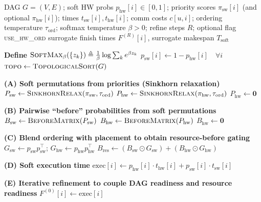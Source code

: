 \begin{algorithm}[!htbp]
\caption{DiffSchedule--Order (Differentiable surrogate for Diff-GNN with ordering)}
\label{alg:diff_order_clean}
\scriptsize
\begin{algorithmic}[1]
\Require DAG $G=(V,E)$; soft HW probs $p_{\mathrm{hw}}[i]\in[0,1]$; priority scores $\pi_{\mathrm{sw}}[i]$ (and optional $\pi_{\mathrm{hw}}[i]$);
times $t_{\mathrm{sw}}[i],t_{\mathrm{hw}}[i]$; comm costs $c[u,i]$; ordering temperature $\tau_{\mathrm{ord}}$; softmax temperature $\beta>0$; refine steps $R$; optional flag \textsc{use\_hw\_ord}
\Ensure surrogate finish times $F^{(R)}[i]$, surrogate makespan $T_{\mathrm{soft}}$

\State \textbf{Define} $\textsc{SoftMax}_\beta(\{z_k\}) \triangleq \frac{1}{\beta}\log\sum_k e^{\beta z_k}$
\State $p_{\mathrm{sw}}[i]\gets 1-p_{\mathrm{hw}}[i]\quad \forall i$
\State $\textsc{topo}\gets\textsc{TopologicalSort}(G)$

\Statex \textbf{(A) Soft permutations from priorities (Sinkhorn relaxation)}
\State $P_{\mathrm{sw}}\gets \textsc{SinkhornRelax}(\pi_{\mathrm{sw}},\tau_{\mathrm{ord}})$
    \State $P_{\mathrm{hw}}\gets \textsc{SinkhornRelax}(\pi_{\mathrm{hw}},\tau_{\mathrm{ord}})$
\Else
    \State $P_{\mathrm{hw}}\gets \mathbf{0}$ 
\EndIf

\Statex \textbf{(B) Pairwise ``before'' probabilities from soft permutations}
\State $B_{\mathrm{sw}}\gets \textsc{BeforeMatrix}(P_{\mathrm{sw}})$ 
    \State $B_{\mathrm{hw}}\gets \textsc{BeforeMatrix}(P_{\mathrm{hw}})$
\Else
    \State $B_{\mathrm{hw}}\gets \mathbf{0}$
\EndIf

\Statex \textbf{(C) Blend ordering with placement to obtain resource-before gating}
\State $G_{\mathrm{sw}}\gets p_{\mathrm{sw}}p_{\mathrm{sw}}^\top$;\;\; $G_{\mathrm{hw}}\gets p_{\mathrm{hw}}p_{\mathrm{hw}}^\top$
\State $B_{\mathrm{res}}\gets (B_{\mathrm{sw}}\odot G_{\mathrm{sw}}) + (B_{\mathrm{hw}}\odot G_{\mathrm{hw}})$
\State {}

\Statex \textbf{(D) Soft execution time}
    \State $\text{exec}[i]\gets p_{\mathrm{hw}}[i]\cdot t_{\mathrm{hw}}[i] + p_{\mathrm{sw}}[i]\cdot t_{\mathrm{sw}}[i]$
\EndFor

\Statex \textbf{(E) Iterative refinement to couple DAG readiness and resource readiness}
 \State $F^{(0)}[i]\gets \text{exec}[i]$ \EndFor


\end{algorithmic}
\end{algorithm}
